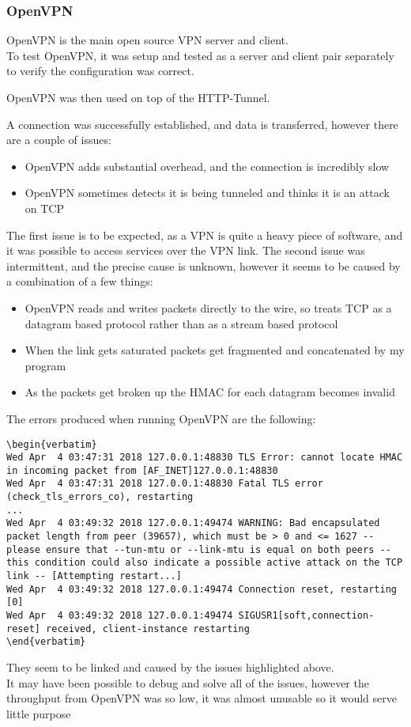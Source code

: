 \subsubsection*{OpenVPN}
OpenVPN is the main open source VPN server and client.\\
To test OpenVPN, it was setup and tested as a server and client pair separately to verify the configuration was correct.\par
OpenVPN was then used on top of the HTTP-Tunnel.\par
A connection was successfully established, and data is transferred, however there are a couple of issues:
\begin{itemize}
    \item OpenVPN adds substantial overhead, and the connection is incredibly slow
    \item OpenVPN sometimes detects it is being tunneled and thinks it is an attack on TCP
\end{itemize}
The first issue is to be expected, as a VPN is quite a heavy piece of software, and it was possible to access services over the VPN link.
The second issue was intermittent, and the precise cause is unknown, however it seems to be caused by a combination of a few things:
\begin{itemize}
    \item OpenVPN reads and writes packets directly to the wire, so treats TCP as a datagram based protocol rather than as a stream based protocol
    \item When the link gets saturated packets get fragmented and concatenated by my program
    \item As the packets get broken up the HMAC for each datagram becomes invalid
\end{itemize}
The errors produced when running OpenVPN are the following:
\begin{lstlisting}[language=none,numbers=none,firstline=2,lastline=7]
\begin{verbatim}
Wed Apr  4 03:47:31 2018 127.0.0.1:48830 TLS Error: cannot locate HMAC in incoming packet from [AF_INET]127.0.0.1:48830
Wed Apr  4 03:47:31 2018 127.0.0.1:48830 Fatal TLS error (check_tls_errors_co), restarting
...
Wed Apr  4 03:49:32 2018 127.0.0.1:49474 WARNING: Bad encapsulated packet length from peer (39657), which must be > 0 and <= 1627 -- please ensure that --tun-mtu or --link-mtu is equal on both peers -- this condition could also indicate a possible active attack on the TCP link -- [Attempting restart...]
Wed Apr  4 03:49:32 2018 127.0.0.1:49474 Connection reset, restarting [0]
Wed Apr  4 03:49:32 2018 127.0.0.1:49474 SIGUSR1[soft,connection-reset] received, client-instance restarting
\end{verbatim}
\end{lstlisting}
They seem to be linked and caused by the issues highlighted above.\\
It may have been possible to debug and solve all of the issues, however the throughput from OpenVPN was so low, it was almost unusable so it would serve little purpose

